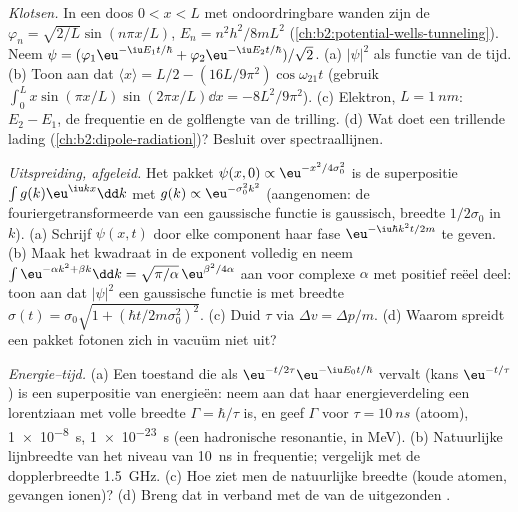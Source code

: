\begin{exercise}[$\star\star\star$]\label{exo:b2:schrodinger-wave-functions:10}
\emph{Klotsen.} In een doos $0 < x < L$ met ondoordringbare wanden zijn de
 $\varphi_n = \sqrt{2/L}\sin(n\pi x/L)$,
$E_n =
n^2h^2/8mL^2$ (\cref{ch:b2:potential-wells-tunneling}). Neem
$\psi =
(\varphi_1\eu^{-\iu E_1t/\hbar} + \varphi_2\eu^{-\iu E_2t/\hbar})/\sqrt2$.
(a)
$|\psi|^2$ als functie van de tijd. (b) Toon aan dat
$\langle x\rangle = L/2 -
(16L/9\pi^2)\cos\omega_{21}t$ (gebruik
$\int_0^L x\sin(\pi x/L)\sin(2\pi x/L)\dd x
= -8L^2/9\pi^2$). (c) Elektron,
$L = \qty{1}{nm}$: $E_2 - E_1$, de
frequentie en de golflengte van de trilling. (d) Wat doet een
trillende lading (\cref{ch:b2:dipole-radiation})? Besluit over
spectraallijnen.
\end{exercise}

\begin{exercise}[$\star\star\star$]\label{exo:b2:schrodinger-wave-functions:11}
\emph{Uitspreiding, afgeleid.} Het pakket $\psi(x,0) \propto \eu^{-x^2/4\sigma_0^2}$
is de superpositie $\int g(k)\eu^{\iu kx}\dd k$ met
$g(k) \propto
\eu^{-\sigma_0^2k^2}$ (aangenomen: de fouriergetransformeerde
van een gaussische functie is
gaussisch, breedte $1/2\sigma_0$ in $k$). (a) Schrijf $\psi(x,t)$ door elke
component haar fase $\eu^{-\iu\hbar k^2t/2m}$ te geven. (b) Maak het kwadraat in
de exponent volledig en neem
$\int\eu^{-\alpha k^2 + \beta k}\dd k = \sqrt{\pi/\alpha}\,
\eu^{\beta^2/4\alpha}$
aan voor complexe $\alpha$ met positief reëel deel: toon aan dat
$|\psi|^2$ een gaussische functie is met breedte
$\sigma(t) = \sigma_0\sqrt{1 + (\hbar t/2m
\sigma_0^2)^2}$. (c) Duid $\tau$
via $\Delta v = \Delta p/m$. (d) Waarom spreidt
een pakket fotonen zich in vacuüm niet uit?
\end{exercise}

\begin{exercise}[$\star\star\star$]\label{exo:b2:schrodinger-wave-functions:12}
\emph{Energie--tijd.} (a) Een toestand die als
$\eu^{-t/2\tau}\eu^{-\iu E_0t/\hbar}$ vervalt
(kans $\eu^{-t/\tau}$) is een superpositie van energieën: neem aan
dat haar energieverdeling een lorentziaan met volle breedte
$\Gamma =
\hbar/\tau$ is, en geef $\Gamma$ voor $\tau = \qty{10}{ns}$
(atoom), \qty{1e-8}{s},
\qty{1e-23}{s} (een hadronische resonantie, in MeV). (b) Natuurlijke lijnbreedte van
het niveau van \qty{10}{ns} in frequentie; vergelijk met de dopplerbreedte
\qty{1.5}{GHz}. (c) Hoe ziet men de natuurlijke breedte (koude atomen,
gevangen ionen)? (d) Breng dat in verband met de  van de uitgezonden
.
\end{exercise}

